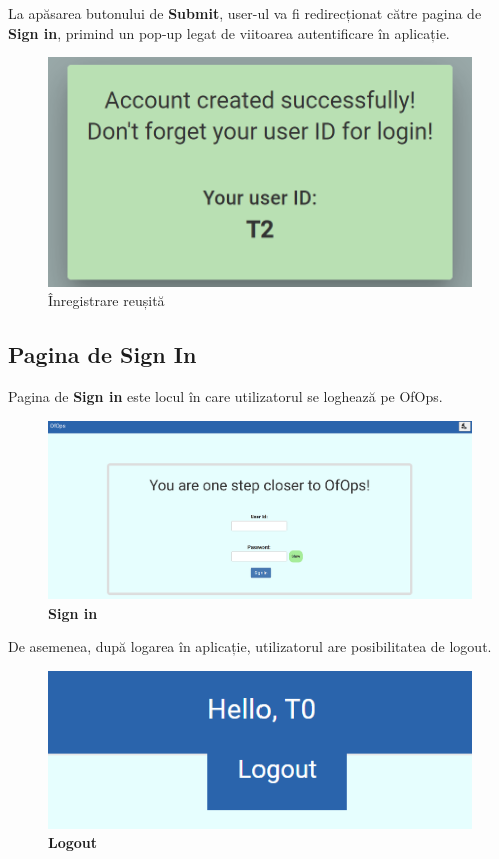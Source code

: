 La apăsarea butonului de \textbf{Submit}, user-ul va fi redirecționat către pagina de \textbf{Sign in}, primind un pop-up legat de viitoarea autentificare în aplicație.  

\begin{figure}[!htb]
    \centering
    \includegraphics[width=0.9\linewidth]{images/autentf.png}
    \caption{Înregistrare reușită}
    \label{fig:autentf}
\end{figure}

\subsection{Pagina de Sign In}
Pagina de \textbf{Sign in} este locul în care utilizatorul se loghează pe OfOps. 

\begin{figure}[!htb]
    \centering
    \includegraphics[width=0.9\linewidth]{images/signin.png}
    \caption{\textbf{Sign in}}
    \label{fig:signin}
\end{figure}

\newpage

De asemenea, după logarea în aplicație, utilizatorul are posibilitatea de logout.

\begin{figure}[!htb]
    \centering
    \includegraphics[width=0.9\linewidth]{images/logout.png}
    \caption{\textbf{Logout}}
    \label{fig:logout}
\end{figure}

